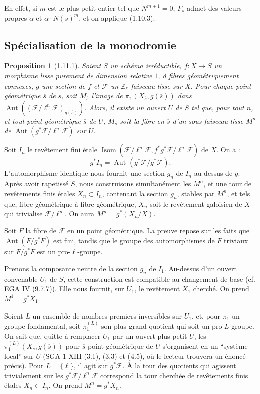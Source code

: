 \documentclass[12pt,a4paper]{article}
\theoremstyle{plain}
\newtheorem{proposition}[theorem]{Proposition}
\theoremstyle{definition}
\theoremstyle{remark}
\DeclareMathOperator{\Aut}{Aut}
\DeclareMathOperator{\Isom}{Isom}
\newcommand{\ZZ}{{\mathbb{Z}}}
\begin{document}
En effet, si $m$ est le plus petit entier tel que $N^{m+1} = 0$, $F_s$ admet des valeurs propres $\alpha$ et $\alpha \cdot N(s)^m$, et on applique (1.10.3).


\subsection{Sp\'ecialisation de la monodromie}

\begin{proposition}[1.11.1]
Soient $S$ un sch\'ema irr\'eductible, $f : X \to S$ un morphisme lisse purement de dimension relative $1$, \`a fibres g\'eom\'etriquement connexes, $g$ une section de $f$ et $\mathscr{F}$ un $\ZZ_\ell$-faisceau lisse sur $X$. Pour chaque point g\'eom\'etrique $\overline{s}$ de $s$, soit $M_{\overline{s}}$ l'image de $\pi_1(X_{\overline{s}}, g(\overline{s}))$ dans $\Aut((\mathscr{F}/\ell^n \mathscr{F})_{g(\overline{s})})$. Alors, il existe un ouvert $U$ de $S$ tel que, pour tout $n$, et tout point g\'eom\'etrique $\overline{s}$ de $U$, $M_{\overline{s}}$ soit la fibre en $\overline{s}$ d'un sous-faisceau lisse $M^n$ de $\Aut(g^*\mathscr{F}/\ell^n \mathscr{F})$ sur $U$.
\end{proposition}

Soit $I_n$ le rev\^etement fini \'etale $\Isom(\mathscr{F}/\ell^n \mathscr{F}, f^*g^*\mathscr{F}/\ell^n \mathscr{F})$ de $X$. On a :
\[ g^* I_n = \Aut(g^*\mathscr{F}/g^*\mathscr{F}). \]
L'automorphisme identique nous fournit une section $g_n$ de $I_n$ au-dessus de $g$. Apr\`es avoir rapetiss\'e $S$, nous construisons simultan\'ement les $M^n$, et une tour de rev\^etements finis \'etales $X_n \subset I_n$, contenant la section $g_n$, stables par $M^n$, et tels que, fibre g\'eom\'etrique \`a fibre g\'eom\'etrique, $X_n$ soit le rev\^etement galoisien de $X$ qui trivialise $\mathscr{F}/\ell^n$. On aura $M^n = g^*(X_n/X)$.

Soit $F$ la fibre de $\mathscr{F}$ en un point g\'eom\'etrique. La preuve repose sur les faits que $\Aut(F/g^*F)$ est fini, tandis que le groupe des automorphismes de $F$ triviaux sur $F/g^*F$ est un pro-$\ell$-groupe.

Prenons la composante neutre de la section $g_n$ de $I_1$. Au-dessus d'un ouvert convenable $U_1$ de $S$, cette construction est compatible au changement de base (cf. EGA IV (9.7.7)). Elle nous fournit, sur $U_1$, le rev\^etement $X_1$ cherch\'e. On prend $M^1 = g^* X_1$.

Soient $L$ un ensemble de nombres premiers inversibles sur $U_1$, et, pour $\pi_1$ un groupe fondamental, soit $\pi_1^{(L)}$ son plus grand quotient qui soit un pro-$L$-groupe. On sait que, quitte \`a remplacer $U_1$ par un ouvert plus petit $U$, les $\pi_1^{(L)}(X_{\overline{s}}, g(\overline{s}))$ pour $\overline{s}$ point g\'eom\'etrique de $U$ s'organisent en un ``syst\`eme local'' sur $U$ (SGA 1 XIII (3.1), (3.3) et (4.5), o\`u le lecteur trouvera un \'enonc\'e pr\'ecis). Pour $L = \{\ell\}$, il agit sur $g^*\mathscr{F}$. \`A la tour des quotients qui agissent trivialement sur les $g^*\mathscr{F}/\ell^n \mathscr{F}$ correspond la tour cherch\'ee de rev\^etements finis \'etales $X_n \subset I_n$. On prend $M^n = g^* X_n$.
\end{document}
